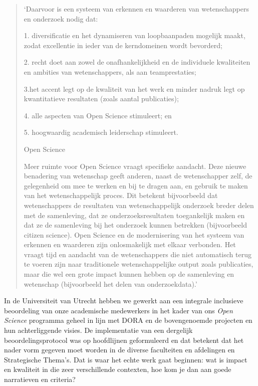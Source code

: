 \documentclass[smallauthor, chapterhaspagenum, nochapterinheader, pagenuminheader,  bigchapnum,medium2, tocpages, garamond, titleinheader]{jote-book}
\begin{document}
	\enlargethispage{-\baselineskip}\checkandfixthelayout
	\begin{quote}
		\itshape

		‘Daarvoor is een systeem van erkennen en waarderen van wetenschappers en onderzoek nodig dat:

		1. diversificatie en het dynamiseren van loopbaanpaden mogelijk maakt, zodat excellentie in ieder van de kerndomeinen wordt bevorderd;

		2. recht doet aan zowel de onafhankelijkheid en de individuele kwaliteiten en ambities van wetenschappers, als aan teamprestaties;

		3.het accent legt op de kwaliteit van het werk en minder nadruk legt op kwantitatieve resultaten (zoals aantal publicaties);

		4. alle aspecten van Open Science stimuleert; en

		5. hoogwaardig academisch leiderschap stimuleert.

		Open Science

		Meer ruimte voor Open Science vraagt specifieke aandacht. Deze nieuwe benadering van wetenschap geeft anderen, naast de wetenschapper zelf, de gelegenheid om mee te werken en bij te dragen aan, en gebruik te maken van het wetenschappelijk proces. Dit betekent bijvoorbeeld dat wetenschappers de resultaten van wetenschappelijk onderzoek breder delen met de samenleving, dat ze onderzoeksresultaten toegankelijk maken en dat ze de samenleving bij het onderzoek kunnen betrekken (bijvoorbeeld citizen science). Open Science en de modernisering van het systeem van erkennen en waarderen zijn onlosmakelijk met elkaar verbonden. Het vraagt tijd en aandacht van de wetenschappers die niet automatisch terug te voeren zijn naar traditionele wetenschappelijke output zoals publicaties, maar die wel een grote impact kunnen hebben op de samenleving en wetenschap (bijvoorbeeld het delen van onderzoekdata).'
	\end{quote}

	In de Universiteit van Utrecht hebben we gewerkt aan een integrale inclusieve beoordeling van onze academische medewerkers in het kader van ons \emph{Open }\emph{Science} programma geheel in lijn met DORA en de bovengenoemde projecten en hun achterliggende visies. De implementatie van een dergelijk beoordelingsprotocol was op hoofdlijnen geformuleerd en dat betekent dat het nader vorm gegeven moet worden in de diverse faculteiten en afdelingen en Strategische Thema's. Dat is waar het echte werk gaat beginnen: wat is impact en kwaliteit in die zeer verschillende contexten, hoe kom je dan aan goede narratieven en criteria?
\end{document}
